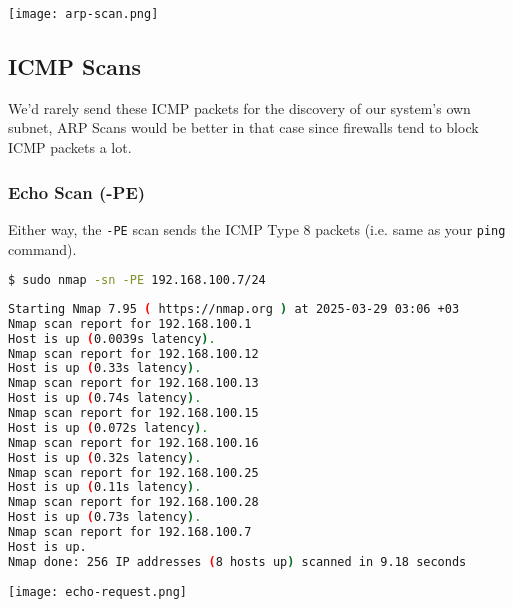 \documentclass[11pt,a4paper]{article}
\newenvironment{commandbox}[1][]{
    \begin{tcolorbox}[
        colback=kalibackground,   
        colframe=commandcolor,    
        fonttitle=\bfseries\color{white},  
        title=#1,               
        breakable=true           
    ]
}{
    \end{tcolorbox}
}
\begin{document}
\vspace{-15pt}
\begin{center}
\texttt{[image: arp-scan.png]}
\label{fig:arp-scan}
\end{center}

\subsection{ICMP Scans}

\begin{tcolorbox}[colback=codebackground, colframe=warningcolor]
    We'd rarely send these ICMP packets for the discovery of our system's own subnet, ARP Scans would be better in that case since firewalls tend to block ICMP packets a lot. 
\end{tcolorbox}

\subsubsection{Echo Scan (-PE)}
Either way, the \texttt{-PE} scan sends the ICMP Type 8 packets (i.e. same as your \texttt{ping} command).
\begin{commandbox}[ICMP Echo Scan (-PE)]
\begin{lstlisting}[language=bash, style=bash, basicstyle=\small\ttfamily\color{warningcolor}]
$ sudo nmap -sn -PE 192.168.100.7/24
\end{lstlisting}

\begin{lstlisting}[basicstyle=\small\ttfamily\color{kalitext}, language=bash, style=bash, breaklines=true, breakindent=0pt]
Starting Nmap 7.95 ( https://nmap.org ) at 2025-03-29 03:06 +03
Nmap scan report for 192.168.100.1
Host is up (0.0039s latency).
Nmap scan report for 192.168.100.12
Host is up (0.33s latency).
Nmap scan report for 192.168.100.13
Host is up (0.74s latency).
Nmap scan report for 192.168.100.15
Host is up (0.072s latency).
Nmap scan report for 192.168.100.16
Host is up (0.32s latency).
Nmap scan report for 192.168.100.25
Host is up (0.11s latency).
Nmap scan report for 192.168.100.28
Host is up (0.73s latency).
Nmap scan report for 192.168.100.7
Host is up.
Nmap done: 256 IP addresses (8 hosts up) scanned in 9.18 seconds
\end{lstlisting}
\end{commandbox}

\vspace{-5pt}
\vspace{5pt}
\begin{center}
    \texttt{[image: echo-request.png]}
    \label{fig:echo-request}
    \end{center}
    
\end{document}
